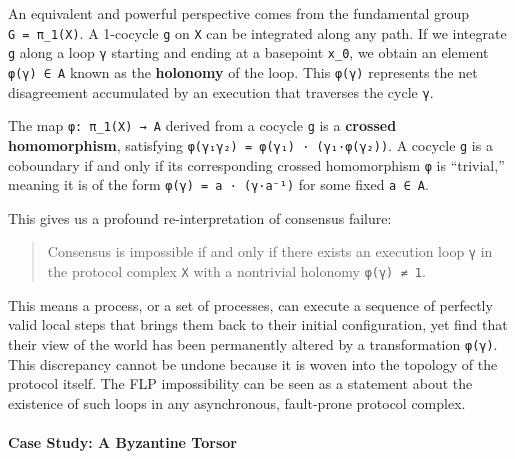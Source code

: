 \documentclass[
]{article}
\begin{document}
An equivalent and powerful perspective comes from the fundamental group
\texttt{G\ =\ π\_1(X)}. A 1-cocycle \texttt{g} on \texttt{X} can be
integrated along any path. If we integrate \texttt{g} along a loop
\texttt{γ} starting and ending at a basepoint \texttt{x\_0}, we obtain
an element \texttt{φ(γ)\ ∈\ A} known as the \textbf{holonomy} of the
loop. This \texttt{φ(γ)} represents the net disagreement accumulated by
an execution that traverses the cycle \texttt{γ}.

The map \texttt{φ:\ π\_1(X)\ →\ A} derived from a cocycle \texttt{g} is
a \textbf{crossed homomorphism}, satisfying
\texttt{φ(γ₁γ₂)\ =\ φ(γ₁)\ ·\ (γ₁·φ(γ₂))}. A cocycle \texttt{g} is a
coboundary if and only if its corresponding crossed homomorphism
\texttt{φ} is ``trivial,'' meaning it is of the form
\texttt{φ(γ)\ =\ a\ ·\ (γ·a⁻¹)} for some fixed \texttt{a\ ∈\ A}.

This gives us a profound re-interpretation of consensus failure:

\begin{quote}
Consensus is impossible if and only if there exists an execution loop
\texttt{γ} in the protocol complex \texttt{X} with a nontrivial holonomy
\texttt{φ(γ)\ ≠\ 1}.
\end{quote}

This means a process, or a set of processes, can execute a sequence of
perfectly valid local steps that brings them back to their initial
configuration, yet find that their view of the world has been
permanently altered by a transformation \texttt{φ(γ)}. This discrepancy
cannot be undone because it is woven into the topology of the protocol
itself. The FLP impossibility can be seen as a statement about the
existence of such loops in any asynchronous, fault-prone protocol
complex.

\paragraph{Case Study: A Byzantine
Torsor}\label{case-study-a-byzantine-torsor}
\end{document}
